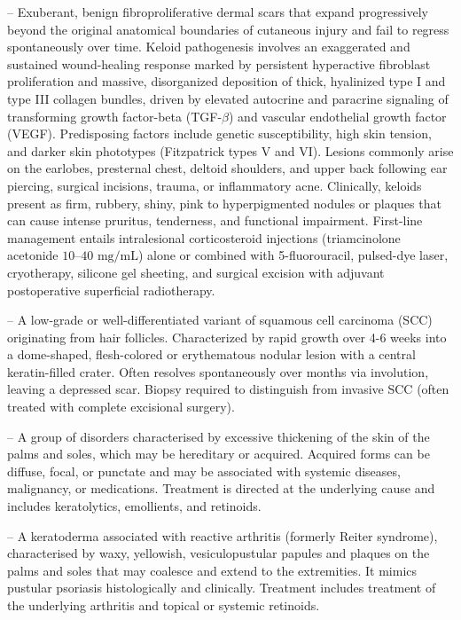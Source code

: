 -- Exuberant, benign fibroproliferative dermal scars that expand progressively beyond the original anatomical boundaries of cutaneous injury and fail to regress spontaneously over time. Keloid pathogenesis involves an exaggerated and sustained wound-healing response marked by persistent hyperactive fibroblast proliferation and massive, disorganized deposition of thick, hyalinized type I and type III collagen bundles, driven by elevated autocrine and paracrine signaling of transforming growth factor-beta (TGF-$\beta$) and vascular endothelial growth factor (VEGF). Predisposing factors include genetic susceptibility, high skin tension, and darker skin phototypes (Fitzpatrick types V and VI). Lesions commonly arise on the earlobes, presternal chest, deltoid shoulders, and upper back following ear piercing, surgical incisions, trauma, or inflammatory acne. Clinically, keloids present as firm, rubbery, shiny, pink to hyperpigmented nodules or plaques that can cause intense pruritus, tenderness, and functional impairment. First-line management entails intralesional corticosteroid injections (triamcinolone acetonide $10\text{--}40\text{ mg/mL}$) alone or combined with 5-fluorouracil, pulsed-dye laser, cryotherapy, silicone gel sheeting, and surgical excision with adjuvant postoperative superficial radiotherapy.

-- A low-grade or well-differentiated variant of squamous cell carcinoma (SCC) originating from hair follicles. Characterized by rapid growth over 4-6 weeks into a dome-shaped, flesh-colored or erythematous nodular lesion with a central keratin-filled crater. Often resolves spontaneously over months via involution, leaving a depressed scar. Biopsy required to distinguish from invasive SCC (often treated with complete excisional surgery).

-- A group of disorders characterised by excessive thickening of the skin of the palms and soles, which may be hereditary or acquired. Acquired forms can be diffuse, focal, or punctate and may be associated with systemic diseases, malignancy, or medications. Treatment is directed at the underlying cause and includes keratolytics, emollients, and retinoids.

-- A keratoderma associated with reactive arthritis (formerly Reiter syndrome), characterised by waxy, yellowish, vesiculopustular papules and plaques on the palms and soles that may coalesce and extend to the extremities. It mimics pustular psoriasis histologically and clinically. Treatment includes treatment of the underlying arthritis and topical or systemic retinoids.


